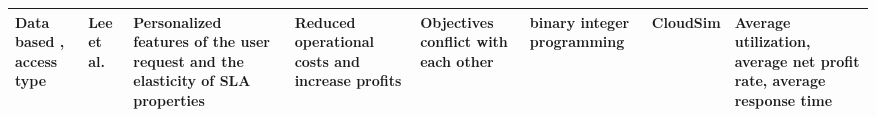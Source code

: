\begin{table*}[p]
{\begin{tabular}{|g{2cm} p{2cm} p{2cm} p{2cm} p{2cm} p{2cm} p{2cm} p{1.9cm}|}
Data based , access type & Lee et al.~\cite{lee2012profit} &  Personalized
features of the user request and the elasticity of SLA properties & Reduced operational costs and increase profits & Objectives conflict with each other & binary integer programming & CloudSim & Average utilization, average net profit rate, average response time  
\\ \hline
\end{tabular}
}
\end{table*}
